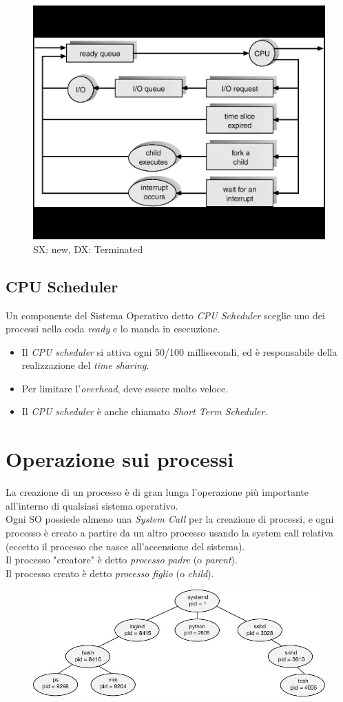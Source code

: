 \begin{figure}[h]
    \centering
    \includegraphics[width=0.5\linewidth]{images/Scheduling_queue_updated.png}
    \caption{SX: new, DX: Terminated}
\end{figure}

\subsection{CPU Scheduler}

Un componente del Sistema Operativo detto \textit{CPU Scheduler} sceglie uno dei processi nella coda \textit{ready} e lo manda in esecuzione.
\begin{itemize}
    \item Il \textit{CPU scheduler} si attiva ogni 50/100 millisecondi, ed è responsabile della realizzazione del \textit{time sharing}.
    \item Per limitare l'\textit{overhead}, deve essere molto veloce.
    \item Il \textit{CPU scheduler} è anche chiamato \textit{Short Term Scheduler}.
\end{itemize}


\section{Operazione sui processi}
La creazione di un processo è di gran lunga l’operazione più importante all’interno di qualsiasi sistema operativo.\\
Ogni SO possiede almeno una \textit{System Call} per la creazione di processi, e ogni processo è creato a partire da un altro processo usando la system call relativa (eccetto il processo che nasce all’accensione del sistema).\\
Il processo "creatore" è detto \textit{processo padre} (o \textit{parent}).\\
Il processo creato è detto \textit{processo figlio} (o \textit{child}).
\begin{figure}[h]
    \centering
    \includegraphics[width=0.5\linewidth]{images/Process_creation.png}
    \label{fig:creation_process}
\end{figure}

